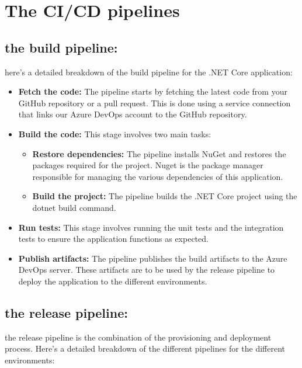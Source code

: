 \section{The CI/CD pipelines}

\subsection*{the build pipeline:}
here's a detailed breakdown of the build pipeline for the .NET Core application:
\begin{itemize}
    \item \textbf{Fetch the code:} The pipeline starts by fetching the latest code from your GitHub repository or a pull request. This is done using a service connection that links our Azure DevOps account to the GitHub repository.
    \item \textbf{Build the code:} This stage involves two main tasks:
          \begin{itemize}
              \item \textbf{Restore dependencies:} The pipeline installs NuGet and restores the packages required for the project. Nuget is the package manager responsible for managing the various dependencies of this application.
              \item \textbf{Build the project:} The pipeline builds the .NET Core project using the dotnet build command.
          \end{itemize}
    \item \textbf{Run tests:} This stage involves running the unit tests and the integration tests to ensure the application functions as expected.
    \item \textbf{Publish artifacts:} The pipeline publishes the build artifacts to the Azure DevOps server. These artifacts are to be used by the release pipeline to deploy the application to the different environments.
\end{itemize}
\subsection*{the release pipeline:}
the release pipeline is the combination of the provisioning and deployment process. Here's a detailed breakdown of the different pipelines for the different environments:
